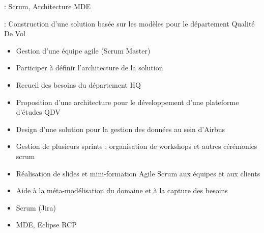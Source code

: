 
 : Scrum, Architecture MDE

 : Construction d'une solution basée sur les modèles pour le département Qualité De Vol 

\bigskip


\begin{itemize}
\item Gestion d'une équipe agile (Scrum Master)
\item Participer à définir l'architecture de la solution
\end{itemize} 


\begin{itemize}
\item Recueil des besoins du département HQ
\item Proposition d'une architecture pour le développement d'une plateforme d'études QDV
\item Design d'une solution pour la gestion des données au sein d'Airbus
\item Gestion de plusieurs sprints : organisation de workshops et autres cérémonies scrum
\item Réalisation de slides et mini-formation Agile Scrum aux équipes et aux clients
\item Aide à la méta-modélisation du domaine et à la capture des besoins
\end{itemize} 


\begin{itemize}
\item Scrum (Jira)
\item MDE, Eclipse RCP
\end{itemize}